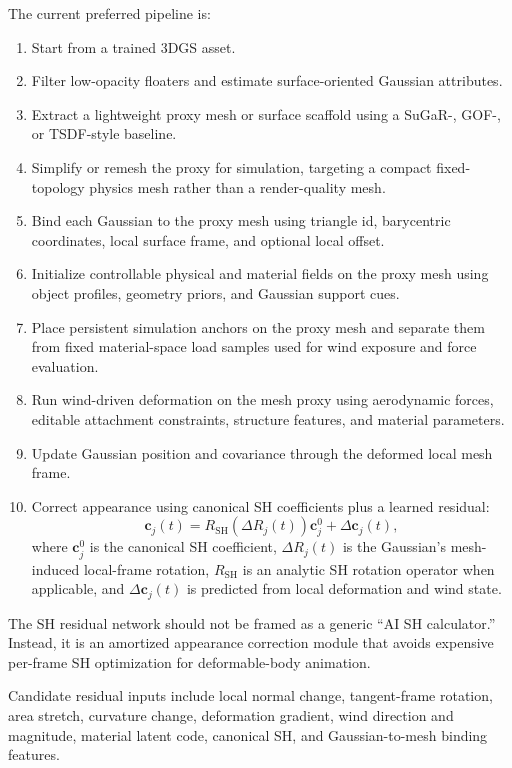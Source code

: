 \documentclass[11pt]{article}
\begin{document}
The current preferred pipeline is:

\begin{enumerate}
  \item Start from a trained 3DGS asset.
  \item Filter low-opacity floaters and estimate surface-oriented Gaussian attributes.
  \item Extract a lightweight proxy mesh or surface scaffold using a SuGaR-, GOF-, or TSDF-style baseline.
  \item Simplify or remesh the proxy for simulation, targeting a compact fixed-topology physics mesh rather than a render-quality mesh.
  \item Bind each Gaussian to the proxy mesh using triangle id, barycentric coordinates, local surface frame, and optional local offset.
  \item Initialize controllable physical and material fields on the proxy mesh using object profiles, geometry priors, and Gaussian support cues.
  \item Place persistent simulation anchors on the proxy mesh and separate them from fixed material-space load samples used for wind exposure and force evaluation.
  \item Run wind-driven deformation on the mesh proxy using aerodynamic forces, editable attachment constraints, structure features, and material parameters.
  \item Update Gaussian position and covariance through the deformed local mesh frame.
  \item Correct appearance using canonical SH coefficients plus a learned residual:
  \[
    \mathbf{c}_j(t) = R_{\mathrm{SH}}(\Delta R_j(t)) \mathbf{c}_j^0 + \Delta \mathbf{c}_j(t),
  \]
  where \(\mathbf{c}_j^0\) is the canonical SH coefficient, \(\Delta R_j(t)\) is the Gaussian's mesh-induced local-frame rotation, \(R_{\mathrm{SH}}\) is an analytic SH rotation operator when applicable, and \(\Delta \mathbf{c}_j(t)\) is predicted from local deformation and wind state.
\end{enumerate}

The SH residual network should not be framed as a generic ``AI SH calculator.'' Instead, it is an amortized appearance correction module that avoids expensive per-frame SH optimization for deformable-body animation.

Candidate residual inputs include local normal change, tangent-frame rotation, area stretch, curvature change, deformation gradient, wind direction and magnitude, material latent code, canonical SH, and Gaussian-to-mesh binding features.
\end{document}
